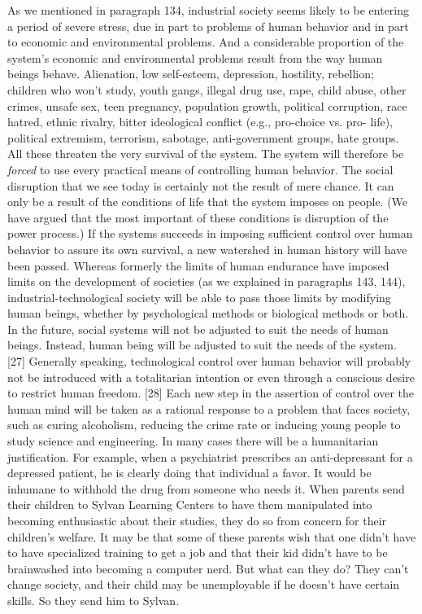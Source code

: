 As we mentioned in paragraph 134, industrial society seems likely to be entering a period of severe stress, due in part to problems of human behavior and in part to economic and environmental problems. And a considerable proportion of the system’s economic and environmental problems result from the way human beings behave. Alienation, low self-esteem, depression, hostility, rebellion; children who won’t study, youth gangs, illegal drug use, rape, child abuse, other crimes, unsafe sex, teen pregnancy, population growth, political corruption, race hatred, ethnic rivalry, bitter ideological conflict (e.g., pro-choice vs. pro- life), political extremism, terrorism, sabotage, anti-government groups, hate groups. All these threaten the very survival of the system. The system will therefore be {\em forced} to use every practical means of controlling human behavior.
 The social disruption that we see today is certainly not the result of mere chance. It can only be a result of the conditions of life that the system imposes on people. (We have argued that the most important of these conditions is disruption of the power process.) If the systems succeeds in imposing sufficient control over human behavior to assure its own survival, a new watershed in human history will have been passed. Whereas formerly the limits of human endurance have imposed limits on the development of societies (as we explained in paragraphs 143, 144), industrial-technological society will be able to pass those limits by modifying human beings, whether by psychological methods or biological methods or both. In the future, social systems will not be adjusted to suit the needs of human beings. Instead, human being will be adjusted to suit the needs of the system. [27]
 Generally speaking, technological control over human behavior will probably not be introduced with a totalitarian intention or even through a conscious desire to restrict human freedom. [28] Each new step in the assertion of control over the human mind will be taken as a rational response to a problem that faces society, such as curing alcoholism, reducing the crime rate or inducing young people to study science and engineering. In many cases there will be a humanitarian justification. For example, when a psychiatrist prescribes an anti-depressant for a depressed patient, he is clearly doing that individual a favor. It would be inhumane to withhold the drug from someone who needs it. When parents send their children to Sylvan Learning Centers to have them manipulated into becoming enthusiastic about their studies, they do so from concern for their children’s welfare. It may be that some of these parents wish that one didn’t have to have specialized training to get a job and that their kid didn’t have to be brainwashed into becoming a computer nerd. But what can they do? They can’t change society, and their child may be unemployable if he doesn’t have certain skills. So they send him to Sylvan.
